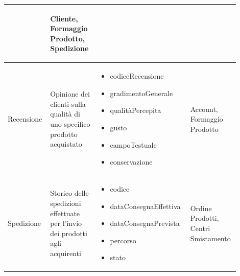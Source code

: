 \documentclass[12pt,a4paper]{article}
\begin{document}
\begin{center}
\begin{longtable}{|p{0.14\linewidth}|p{0.20\linewidth}|p{0.36\linewidth}|p{0.20\linewidth}|}
\begin{itemize}
						
						
					\end{itemize}
					& \begin{flushleft}\vspace{-25pt} Cliente, Formaggio Prodotto, Spedizione \end{flushleft} \\ 

\hline
Recensione 			& \begin{flushleft}\vspace{-25pt} Opinione dei clienti sulla qualità di uno specifico prodotto acquistato  \end{flushleft}
					& \begin{itemize}
						\setlength{\itemindent}{-1em}
						\vspace{-25pt}
						\setlength\itemsep{-0.25em}
						\item codiceRecensione
						\item gradimentoGenerale
						\item qualitàPercepita
						\item gusto
						\item campoTestuale
						\item conservazione
						
						
						
					\end{itemize}
					& \begin{flushleft}\vspace{-25pt} Account, Formaggio Prodotto \end{flushleft} \\ 

\hline
Spedizione 			& \begin{flushleft}\vspace{-25pt} Storico delle spedizioni effettuate per l'invio dei prodotti agli acquirenti  \end{flushleft}
					& \begin{itemize}
						\setlength{\itemindent}{-1em}
						\vspace{-25pt}
						\setlength\itemsep{-0.25em}
						\item codice
						\item dataConsegnaEffettiva
						\item dataConsegnaPrevista
						\item percorso
						\item stato
					\end{itemize}
					& \begin{flushleft}\vspace{-25pt} Ordine Prodotti, Centri Smistamento \end{flushleft} \\ 

\hline


\end{longtable}
\end{center}
\pagebreak
\end{document}
